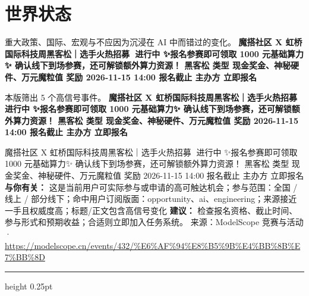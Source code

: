 \documentclass[10.5pt]{ctexart}
\begin{document}
\section*{世界状态}
{\color{ormuted} 重大政策、国际、宏观与不应因为沉浸在 AI 中而错过的变化。}
\vspace{2mm}
{\LARGE\bfseries 魔搭社区 X 虹桥国际科技周黑客松｜选手火热招募🚀 进行中 ✨报名参赛即可领取 1000 元基础算力✨ 确认线下到场参赛，还可解锁额外算力资源！ 黑客松 类型 现金奖金、神秘硬件、万元魔粒值 奖励 2026-11-15 14:00 报名截止 主办方 立即报名}\par
\vspace{1mm}
{\color{ormuted} 本版筛出 5 个高信号事件。}
\vspace{3mm}
{\Large\bfseries 魔搭社区 X 虹桥国际科技周黑客松｜选手火热招募🚀 进行中 ✨报名参赛即可领取 1000 元基础算力✨ 确认线下到场参赛，还可解锁额外算力资源！ 黑客松 类型 现金奖金、神秘硬件、万元魔粒值 奖励 2026-11-15 14:00 报名截止 主办方 立即报名}\par
魔搭社区 X 虹桥国际科技周黑客松｜选手火热招募🚀 进行中 ✨报名参赛即可领取 1000 元基础算力✨ 确认线下到场参赛，还可解锁额外算力资源！ 黑客松 类型 现金奖金、神秘硬件、万元魔粒值 奖励 2026-11-15 14:00 报名截止 主办方 立即报名
\textbf{与你有关：} 这是当前用户可实际参与或申请的高可触达机会；参与范围：全国 / 线上 / 部分线下；命中用户订阅版面：opportunity、ai、engineering；来源接近一手且权威度高；标题/正文包含高信号变化
\textbf{建议：} 检查报名资格、截止时间、参与形式和预期收益；合适则立即加入任务系统。
{\footnotesize\color{ormuted} 来源：ModelScope 竞赛与活动 · \url{https://modelscope.cn/events/432/%E6%AF%94%E8%B5%9B%E4%BB%8B%E7%BB%8D}}
\vspace{4mm}
\hrule height 0.25pt
\vspace{3mm}
\end{document}
